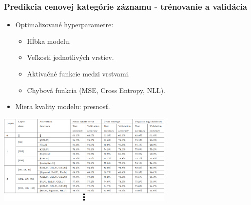 \documentclass[slovak,10pt]{beamer}
\begin{document}
\begin{frame}
	\frametitle{Predikcia cenovej kategórie záznamu - trénovanie a validácia}
	\begin{itemize}
		\item<1> Optimalizované hyperparametre:
		\begin{itemize}
			\item<1> Hĺbka modelu.
			\item<1> Veľkosti jednotlivých vrstiev.
			\item<1> Aktivačné funkcie medzi vrstvami.
			\item<1> Chybová funkcia (MSE, Cross Entropy, NLL).
		\end{itemize}
		\item<1> Miera kvality modelu: presnosť.
	\end{itemize}
	\begin{center}
		\includegraphics[height=4.5cm]{images/MLP_train.png}
	\end{center}
		
\end{frame}
\end{document}
